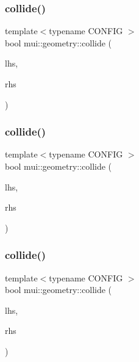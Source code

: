 \subsubsection{\texorpdfstring{collide()}{collide()}\hspace{0.1cm}{\footnotesize\ttfamily [6/10]}}
{\footnotesize\ttfamily template$<$typename C\+O\+N\+F\+IG $>$ \\
bool mui\+::geometry\+::collide (\begin{DoxyParamCaption}\item[{const \hyperlink{classmui_1_1geometry_1_1point}{point}$<$ C\+O\+N\+F\+IG $>$ \&}]{lhs,  }\item[{const \hyperlink{classmui_1_1geometry_1_1sphere}{sphere}$<$ C\+O\+N\+F\+IG $>$ \&}]{rhs }\end{DoxyParamCaption})}

\mbox{\label{namespacemui_1_1geometry_a9cc781267fb931e623e79bc7f2d46d97}} 
\subsubsection{\texorpdfstring{collide()}{collide()}\hspace{0.1cm}{\footnotesize\ttfamily [7/10]}}
{\footnotesize\ttfamily template$<$typename C\+O\+N\+F\+IG $>$ \\
bool mui\+::geometry\+::collide (\begin{DoxyParamCaption}\item[{const \hyperlink{classmui_1_1geometry_1_1point}{point}$<$ C\+O\+N\+F\+IG $>$ \&}]{lhs,  }\item[{const \hyperlink{classmui_1_1geometry_1_1box}{box}$<$ C\+O\+N\+F\+IG $>$ \&}]{rhs }\end{DoxyParamCaption})}

\mbox{\label{namespacemui_1_1geometry_a074743f03df5179b768622aced179b7a}} 
\subsubsection{\texorpdfstring{collide()}{collide()}\hspace{0.1cm}{\footnotesize\ttfamily [8/10]}}
{\footnotesize\ttfamily template$<$typename C\+O\+N\+F\+IG $>$ \\
bool mui\+::geometry\+::collide (\begin{DoxyParamCaption}\item[{const \hyperlink{classmui_1_1geometry_1_1sphere}{sphere}$<$ C\+O\+N\+F\+IG $>$ \&}]{lhs,  }\item[{const \hyperlink{classmui_1_1geometry_1_1sphere}{sphere}$<$ C\+O\+N\+F\+IG $>$ \&}]{rhs }\end{DoxyParamCaption})}

